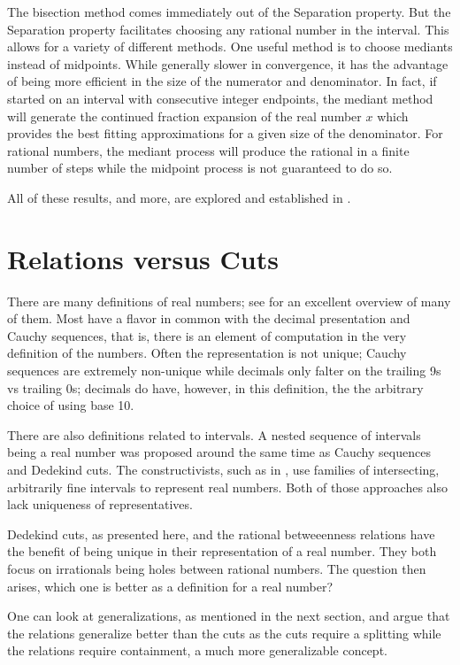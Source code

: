 \documentclass[12pt]{article}
\begin{document}
The bisection method comes immediately out of the Separation property. But the Separation property facilitates choosing any rational number in the interval. This allows for a variety of different methods. One useful method is to choose mediants instead of midpoints. While generally slower in convergence, it has the advantage of being more efficient in the size of the numerator and denominator. In fact, if started on an interval with consecutive integer endpoints, the mediant method will generate the continued fraction expansion of the real number $x$ which provides the best fitting approximations for a given size of the denominator. For rational numbers, the mediant process will produce the rational in a finite number of steps while the midpoint process is not guaranteed to do so. 

All of these results, and more, are explored and established in \cite{taylor23main}.

\section{Relations versus Cuts}

There are many definitions of real numbers; see \cite{ittay-2015} for an excellent overview of many of them. Most have a flavor in common with the decimal presentation and Cauchy sequences, that is, there is an element of computation in the very definition of the numbers. Often the representation is not unique; Cauchy sequences are extremely non-unique while decimals only falter on the trailing 9s vs trailing 0s; decimals do have, however, in this definition, the the arbitrary choice of using base 10. 

There are also definitions related to intervals. A nested sequence of intervals being a real number was proposed around the same time as Cauchy sequences and Dedekind cuts. The constructivists, such as in \cite{bridger}, use families of intersecting, arbitrarily fine intervals to represent real numbers. Both of those approaches also lack uniqueness of representatives. 

Dedekind cuts, as presented here, and the rational betweeenness relations have the benefit of being unique in their representation of a real number. They both focus on irrationals being holes between rational numbers. The question then arises, which one is better as a definition for a real number? 

One can look at generalizations, as mentioned in the next section, and argue that the relations generalize better than the cuts as the cuts require a splitting while the relations require containment, a much more generalizable concept. 
\end{document}
